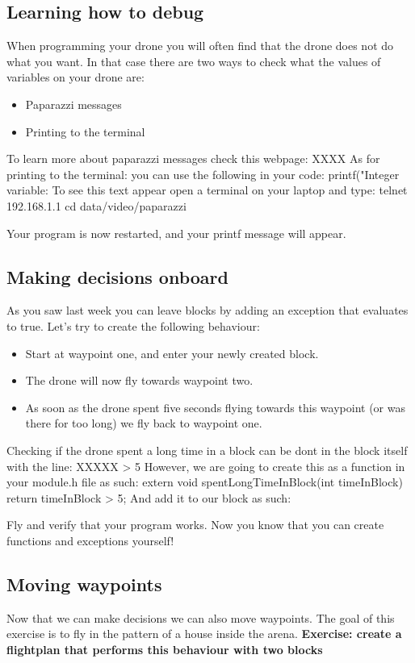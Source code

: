 \documentclass{article}
\begin{document}
\subsection*{Learning how to debug}
When programming your drone you will often find that the drone does not do what you want. In that case there are two ways to check what the values of variables on your drone are:
\begin{itemize}
	\item Paparazzi messages
	\item Printing to the terminal
\end{itemize}
To learn more about paparazzi messages check this webpage: XXXX
As for printing to the terminal: you can use the following in your code:
printf("Integer variable: %
To see this text appear open a terminal on your laptop and type:
telnet 192.168.1.1
cd data/video/paparazzi

Your program is now restarted, and your printf message will appear. 

\subsection*{Making decisions onboard}
As you saw last week you can leave blocks by adding an exception that evaluates to true. 
Let's try to create the following behaviour: 
\begin{itemize}
\item Start at waypoint one, and enter your newly created block. 
\item The drone will now fly towards waypoint two. 
\item As soon as the drone spent five seconds flying towards this waypoint (or was there for too long) we fly back to waypoint one. 
\end{itemize}
Checking if the drone spent a long time in a block can be dont in the block itself with the line:
XXXXX > 5
However, we are going to create this as a function in your module.h file as such:
extern void spentLongTimeInBlock(int timeInBlock){
	return timeInBlock > 5;
}
And add it to our block as such:

Fly and verify that your program works. Now you know that you can create functions and exceptions yourself!

\subsection*{Moving waypoints}
Now that we can make decisions we can also move waypoints. The goal of this exercise is to fly in the pattern of a house inside the arena. 
\textbf{Exercise: create a flightplan that performs this behaviour with two blocks}
\end{document}

